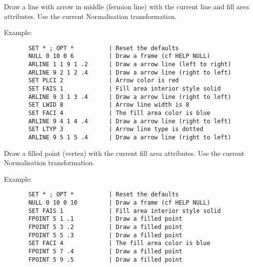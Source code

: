 \ENDCMD


\BEGARG
{}
\ENDARG

   \par
Draw a line with arrow in middle (fermion line) with the current line and 
   fill area attributes.  Use the current Normalisation transformation.  

   \par
Example:  
\begin{verbatim}
       SET * ; OPT *          | Reset the defaults
       NULL 0 10 0 6          | Draw a frame (cf HELP NULL)
       ARLINE 1 1 9 1 .2      | Draw a arrow line (left to right)
       ARLINE 9 2 1 2 .4      | Draw a arrow line (right to left)
       SET PLCI 2             | Arrow color is red
       SET FAIS 1             | Fill area interior style solid
       ARLINE 9 3 1 3 .4      | Draw a arrow line (right to left)
       SET LWID 8             | Arrow line width is 8
       SET FACI 4             | The fill area color is blue
       ARLINE 9 4 1 4 .4      | Draw a arrow line (right to left)
       SET LTYP 3             | Arrow line type is dotted
       ARLINE 9 5 1 5 .4      | Draw a arrow line (right to left)
\end{verbatim}

\ENDCMD


\BEGARG
{}
\ENDARG

   \par
Draw a filled point (vertex) with the current fill area attributes.  Use 
   the current Normalisation transformation.  

   \par
Example:  
\begin{verbatim}
       SET * ; OPT *          | Reset the defaults
       NULL 0 10 0 10         | Draw a frame (cf HELP NULL)
       SET FAIS 1             | Fill area interior style solid
       FPOINT 5 1 .1          | Draw a filled point
       FPOINT 5 3 .2          | Draw a filled point
       FPOINT 5 5 .3          | Draw a filled point
       SET FACI 4             | The fill area color is blue
       FPOINT 5 7 .4          | Draw a filled point
       FPOINT 5 9 .5          | Draw a filled point
\end{verbatim}

